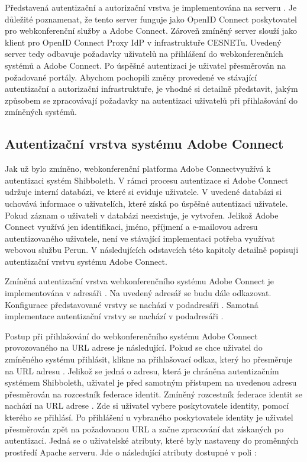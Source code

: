 \documentclass[
  printed, %
  twoside, %
  table,   %
  nolof,     %
  nolot,     %
]{fithesis3}
\begin{document}
Představená autentizační a autorizační vrstva je implementována na serveru . Je důležité poznamenat, že tento server funguje jako OpenID Connect poskytovatel pro webkonferenční služby  a Adobe Connect. Zároveň zmíněný server slouží jako klient pro OpenID Connect Proxy IdP v infrastruktuře CESNETu. Uvedený server tedy odbavuje požadavky uživatelů na přihlášení do webkonferenčních systémů  a Adobe Connect. Po úspěšné autentizaci je uživatel přesměrován na požadované portály. Abychom pochopili změny provedené ve stávající autentizační a autorizační infrastruktuře, je vhodné si detailně představit, jakým způsobem se zpracovávají požadavky na autentizaci uživatelů při přihlašování do zmíněných systémů.  

\subsection{Autentizační vrstva systému Adobe Connect}
\label{ac-old}
Jak už bylo zmíněno, webkonferenční platforma Adobe Connect\break využívá k autentizaci systém Shibboleth. V rámci procesu autentizace si Adobe Connect udržuje interní databázi, ve které si eviduje uživatele. V uvedené databázi si uchovává informace o uživatelích,
které získá po úspěšné autentizaci uživatele. Pokud záznam o uživateli
v databázi neexistuje, je vytvořen. Jelikož Adobe Connect využívá jen
identifikaci, jméno, příjmení a e-mailovou adresu autentizovaného uživatele, není ve stávající implementaci
potřeba využívat webovou službu Perun. V následujících odstavcích této kapitoly detailně popisuji autentizační vrstvu systému Adobe Connect. \par

Zmíněná autentizační vrstva webkonferenčního systému Adobe Connect je implementována v adresáři . Na uvedený adresář se budu dále odkazovat. Konfigurace představované vrstvy se nachází v podadresáři . Samotná implementace autentizační vrstvy se nachází v podadresáři . \par

Postup při přihlašování do webkonferenčního systému Adobe Connect provozovaného na URL adrese  je následující. Pokud se chce uživatel do zmíněného systému přihlásit, klikne na přihlašovací odkaz, který ho přesměruje na URL adresu . Jelikož se jedná o adresu, která je chráněna autentizačním systémem Shibboleth, uživatel je před samotným přístupem na uvedenou adresu přesměrován na rozcestník federace identit. Zmíněný rozcestník federace identit se nachází na URL adrese . Zde si uživatel vybere poskytovatele identity, pomocí kterého se přihlásí. Po přihlášení u vybraného poskytovatele identity je uživatel  přesměrován zpět na požadovanou URL  a začne zpracování dat získaných po autentizaci. Jedná se o uživatelské atributy, které byly nastaveny do proměnných prostředí Apache serveru. Jde o následující atributy dostupné v poli : 
\end{document}
